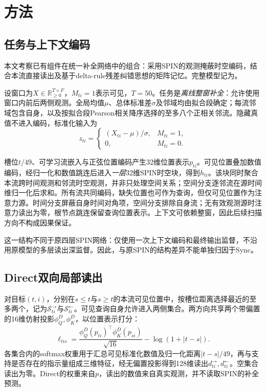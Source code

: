 \section{方法}
\label{sec:method}

\subsection{任务与上下文编码}
本文考察已有组件在统一补全网络中的组合：采用SPIN的观测掩蔽时空编码\cite{marisca2022spin}，结合本流直接读出及基于delta-rule残差纠错思想的矩阵记忆\cite{yang2024deltanet}。完整模型记为\full{}。

设窗口为$X\in\mathbb R_{\geq0}^{T\times F}$，$M_{ti}=1$表示可见，$T=50$。任务是\emph{离线整窗补全}：允许使用窗口内前后两侧观测。全局均值$\mu$、总体标准差$\sigma$及邻域均由拟合段确定；每流邻域包含自身，以及按拟合段Pearson相关降序选择的至多八个正相关邻流。隐藏真值不进入编码，标准化输入为
\begin{equation}
 z_{ti}=\begin{cases}(X_{ti}-\mu)/\sigma,&M_{ti}=1,\\0,&M_{ti}=0.\end{cases}
 \label{eq:observed-input}
\end{equation}

槽位$t/49$、可学习流嵌入与正弦位置编码产生32维位置表示$p_{ti}$。可见位置叠加数值编码，经归一化和数值跳连后进入\emph{一层}32维SPIN时空块，得到$h_{ti}$。该块同时聚合本流跨时间观测和邻流时空观测，并非只处理空间关系；空间分支逐邻流在源时间维归一化后求和。所有流共同编码，缺失位置也可作为查询，但仅可见位置作为注意力源。时间分支屏蔽自身时间对角项，空间分支排除自身流；无有效观测源时注意力读出为零，根节点跳连保留查询位置表示。上下文可依赖整窗，因此后续扫描方向不构成因果保证。

这一结构不同于原四层SPIN网络：仅使用一次上下文编码和最终输出监督，不沿用原模型的多层读出深监督。因此，与原SPIN的结构差异不能单独归因于Sync。

\subsection{Direct双向局部读出}
对目标$(t,i)$，分别在$s\leq t$与$s\geq t$的本流可见位置中，按槽位距离选择最近的至多两个，记为$\mathcal S^{\rightarrow}_{ti}$与$\mathcal S^{\leftarrow}_{ti}$。可见查询自身允许进入两侧集合。两方向共享两个带偏置的16维仿射投影$\phi_Q^D,\phi_K^D$，以位置表示打分：
\begin{equation}
 \ell_{tis}=\frac{\phi_Q^D(p_{ti})^\top\phi_K^D(p_{si})}{\sqrt{16}}
 -\log(1+|t-s|).
 \label{eq:direct-score}
\end{equation}
各集合内的softmax权重用于汇总可见标准化数值及归一化距离$|t-s|/49$，再与支持是否存在的指示量组成三维特征，经无偏置投影得到128维读出$d^{\rightarrow}_{ti},d^{\leftarrow}_{ti}$。空集合读出为零。Direct的权重来自$p$，读出的数值来自真实观测，并不读取SPIN的补全预测。

